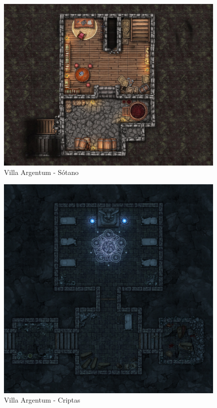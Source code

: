 \documentclass[10pt,twoside,twocolumn,openany]{dndbook}
\begin{document}
\begin{figure}[hb!]
  \centering
  \includegraphics[width=\textwidth]{maps/villa-argentum-s1.jpg}
  \caption{Villa Argentum - Sótano}
  \label{fig:vas1}
\end{figure}

\begin{figure}[hb!]
  \centering
  \includegraphics[width=\textwidth]{maps/villa-argentum-s2.jpg}
  \caption{Villa Argentum - Criptas}
  \label{fig:vas2}
\end{figure}
\end{document}
